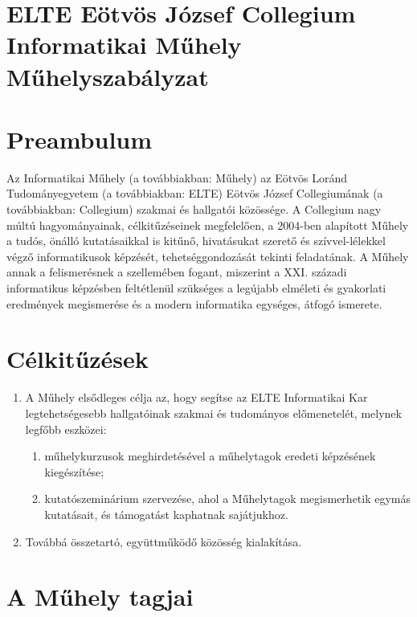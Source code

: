 \documentclass{../styles/rulebook}
\begin{document}
\section*{ELTE Eötvös József Collegium \\ Informatikai Műhely\\ \vspace{0.5em} Műhelyszabályzat} 

\vspace{2em}

\section*{Preambulum}

Az Informatikai Műhely (a továbbiakban: Műhely) az Eötvös Loránd Tudományegyetem (a továbbiakban: ELTE) Eötvös József Collegiumának (a továbbiakban: Collegium) szakmai és hallgatói közössége.
A Collegium nagy múltú hagyományainak, célkitűzéseinek megfelelően, a 2004-ben alapított Műhely a tudós, önálló kutatásaikkal is kitűnő, hivatásukat szerető és szívvel-lélekkel végző informatikusok képzését, tehetséggondozását tekinti feladatának. A Műhely annak a felismerésnek a szellemében fogant, miszerint a XXI. századi informatikus képzésben feltétlenül szükséges a legújabb elméleti és gyakorlati eredmények megismerése és a modern informatika egységes, átfogó ismerete.

\section{Célkitűzések}

\begin{enumerate}
	\item A Műhely elsődleges célja az, hogy segítse az ELTE Informatikai Kar legtehetségesebb hallgatóinak szakmai és tudományos előmenetelét, melynek legfőbb eszközei:
	\begin{enumerate}
		\item műhelykurzusok meghirdetésével a műhelytagok eredeti képzésének kiegészítése;
		\item kutatószeminárium szervezése, ahol a Műhelytagok megismerhetik egymás kutatásait, és támogatást kaphatnak sajátjukhoz.
	\end{enumerate}
	\item Továbbá összetartó, együttműködő közösség kialakítása.
\end{enumerate}

\section{A Műhely tagjai}
\end{document}
